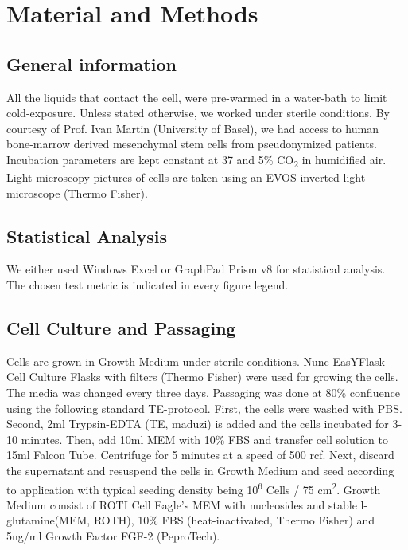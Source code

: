 \newcommand{\product}{\textit}

\chapter{Material and Methods}

\section{General information}
All the liquids that contact the cell, were pre-warmed in a water-bath to limit cold-exposure. Unless stated otherwise, we worked under sterile conditions. By courtesy of Prof. Ivan Martin (University of Basel), we had access to human bone-marrow derived mesenchymal stem cells from pseudonymized patients. Incubation parameters are kept constant at 37 \degC and 5\% CO\textsubscript{2} in humidified air. Light microscopy pictures of cells are taken using an EVOS inverted light microscope (Thermo Fisher).

\section{Statistical Analysis}
We either used Windows Excel or GraphPad Prism v8 for statistical analysis. The chosen test metric is indicated in every figure legend.

\section{Cell Culture and Passaging}
Cells are grown in Growth Medium under sterile conditions. Nunc\texttrademark{} EasYFlask\texttrademark{} Cell Culture Flasks with filters (Thermo Fisher) were used for growing the cells. The media was changed every three days. Passaging was done at 80\% confluence using the following standard TE-protocol. First, the cells were washed with PBS. Second, 2ml Trypsin-EDTA (TE, maduzi) is added and the cells incubated for 3-10 minutes. Then, add 10ml MEM\textalpha{} with 10\% FBS and transfer cell solution to 15ml Falcon Tube. Centrifuge for 5 minutes at a speed of 500 rcf. Next, discard the supernatant and resuspend the cells in Growth Medium and seed according to application with typical seeding density being 10\textsuperscript{6} Cells / 75 cm\textsuperscript{2}. 
Growth Medium consist of ROTI\textregistered{} Cell Eagle's MEM\textalpha{} with nucleosides and stable l-glutamine(MEM\textalpha{}, ROTH), 10\% FBS (heat-inactivated, Thermo Fisher) and 5ng/ml Growth Factor FGF-2 (PeproTech).

